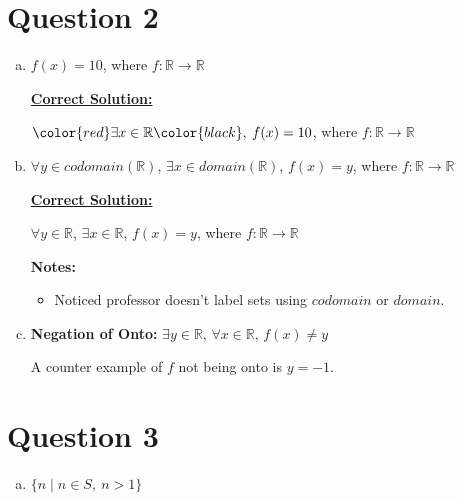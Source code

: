 \documentclass[12pt]{article}
\begin{document}
\section*{Question 2}
\begin{enumerate}[a.]
    \item

    $f(x) = 10$, where $f:\mathbb{R} \to \mathbb{R}$

    \bigskip

    \begin{mdframed}
        \underline{\textbf{Correct Solution:}}

        \bigskip

        $\color{red}\exists x \in \mathbb{R}\color{black},\:f(x) = 10$, where $f:\mathbb{R} \to \mathbb{R}$

    \end{mdframed}

    \item

    $\forall y \in codomain(\mathbb{R})$, $\exists x \in domain(\mathbb{R})$, $f(x) = y$, where $f:\mathbb{R} \to \mathbb{R}$

    \bigskip

    \begin{mdframed}
        \underline{\textbf{Correct Solution:}}

        \bigskip

        \color{red}$\forall y \in \mathbb{R}$, $\exists x \in \mathbb{R}$\color{black}, $f(x) = y$, where $f:\mathbb{R} \to \mathbb{R}$

    \end{mdframed}

    \bigskip

    \textbf{Notes:}

    \begin{itemize}
        \item Noticed professor doesn't label sets using $codomain$ or $domain$.
    \end{itemize}

    \item

    \textbf{Negation of Onto:} $\exists y \in \mathbb{R}$, $\forall x \in \mathbb{R}$, $f(x) \neq y$

    \bigskip

    A counter example of $f$ not being onto is $y = -1$.

\end{enumerate}

\section*{Question 3}
\begin{enumerate}[a.]
    \item $\{n \mid n \in S,\:n > 1\}$
\end{enumerate}
\end{document}
